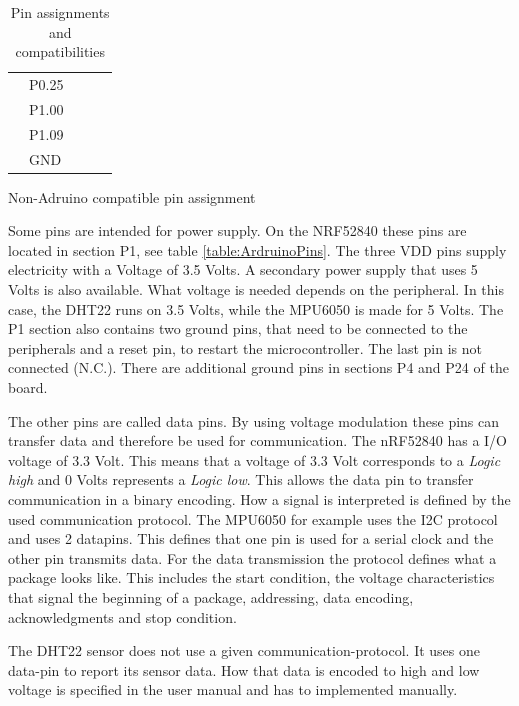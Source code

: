\begin{table}[ht!]
\begin{subtable}[b]{.4\linewidth}
\begin{tabular}{l|l|l|l|l|}
			\multicolumn{1}{|l|}{} & P0.25  &               &             &             \\
			\multicolumn{1}{|l|}{} & P1.00  &               &             &             \\
			\multicolumn{1}{|l|}{} & P1.09  &               &             &             \\
			\multicolumn{1}{|l|}{} & GND    &               &             &             \\
			\hline
		\end{tabular}
		\caption{Non-Adruino compatible pin assignment}
		\label{table:otherPins}
	\end{subtable}
	\caption{Pin assignments and compatibilities}
\end{table}

Some pins are intended for power supply.
On the NRF52840 these pins are located in section P1, see table \ref{table:ArdruinoPins}.
The three VDD pins supply electricity with a Voltage of 3.5 Volts.
A secondary power supply that uses 5 Volts is also available.
What voltage is needed depends on the peripheral.
In this case, the DHT22 runs on 3.5 Volts, while the MPU6050 is made for 5 Volts.
The P1 section also contains two ground pins, that need to be connected to the peripherals and a reset pin, to restart the microcontroller.
The last pin is not connected (N.C.).
There are additional ground pins in sections P4 and P24 of the board.

The other pins are called data pins.
By using voltage modulation these pins can transfer data and therefore be used for communication.
The nRF52840 has a I/O voltage of 3.3 Volt.
This means that a voltage of 3.3 Volt corresponds to a \textit{Logic high} and 0 Volts represents a \textit{Logic low}.
This allows the data pin to transfer communication in a binary encoding.
How a signal is interpreted is defined by the used communication protocol.
The MPU6050 for example uses the I2C protocol and uses 2 datapins.
This defines that one pin is used for a serial clock and the other pin transmits data.
For the data transmission the protocol defines what a package looks like.
This includes the start condition, the voltage characteristics that signal the beginning of a package, addressing, data encoding, acknowledgments and stop condition.

The DHT22 sensor does not use a given communication-protocol.
It uses one data-pin to report its sensor data.
How that data is encoded to high and low voltage is specified in the user manual \cite{AM2302} and has to implemented manually.

